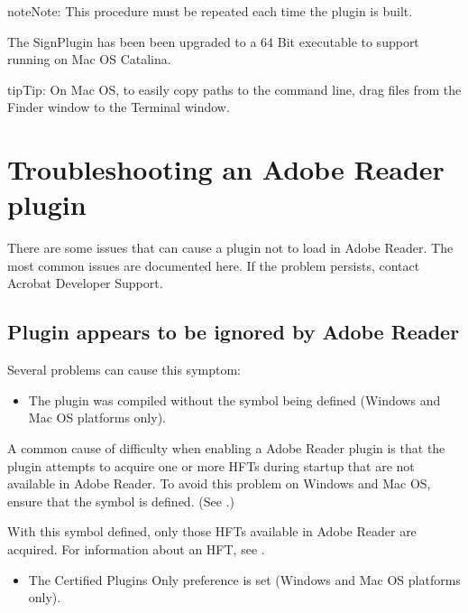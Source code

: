 \documentclass[letterpaper,12pt,english,openany,oneside]{sphinxmanual}
\begin{document}
\begin{sphinxadmonition}{note}{Note:}
This procedure must be repeated each time the plugin is built.
\end{sphinxadmonition}

The SignPlugin has been been upgraded to a 64 Bit executable to support running on Mac OS Catalina.

\begin{sphinxadmonition}{tip}{Tip:}
On Mac OS, to easily copy paths to the command line, drag files from the Finder window to the Terminal window.
\end{sphinxadmonition}


\section{Troubleshooting an Adobe Reader plugin}
\label{\detokenize{Plugins_ReaderPlug:troubleshooting-an-adobe-reader-plugin}}
There are some issues that can cause a plugin not to load in Adobe Reader. The most common issues are documented here. If the problem persists, contact Acrobat Developer Support.


\subsection{Plugin appears to be ignored by Adobe Reader}
\label{\detokenize{Plugins_ReaderPlug:plugin-appears-to-be-ignored-by-adobe-reader}}
Several problems can cause this symptom:
\begin{itemize}
\item {} 
The plugin was compiled without the  symbol being defined (Windows and Mac OS platforms only).

\end{itemize}

A common cause of difficulty when enabling a Adobe Reader plugin is that the plugin attempts to acquire one or more HFTs during startup that are not available in Adobe Reader. To avoid this problem on Windows and Mac OS, ensure that the  symbol is defined. (See .)

With this symbol defined, only those HFTs available in Adobe Reader are acquired. For information about an HFT, see .
\begin{itemize}
\item {} 
The Certified Plugins Only preference is set (Windows and Mac OS platforms only).

\end{itemize}
\end{document}
